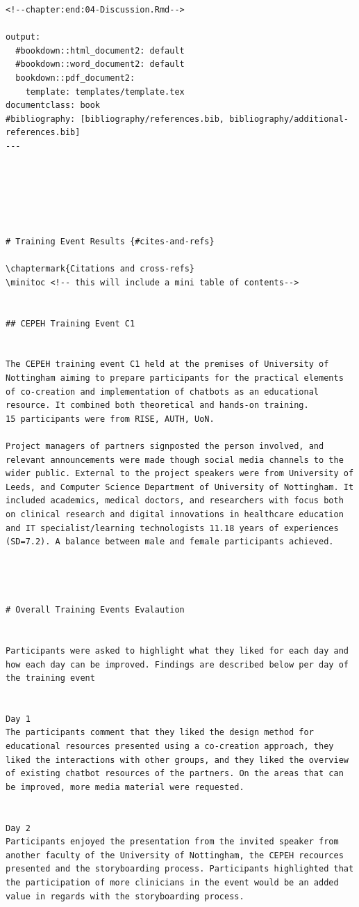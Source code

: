 \documentclass[a4paper, nobind]{templates/ociamthesis}
\renewcommand{\chaptermark}[1]{\markboth{\thechapter. #1}{\thechapter. #1}}
\begin{document}
\begin{verbatim}
<!--chapter:end:04-Discussion.Rmd-->

output:
  #bookdown::html_document2: default
  #bookdown::word_document2: default
  bookdown::pdf_document2: 
    template: templates/template.tex
documentclass: book
#bibliography: [bibliography/references.bib, bibliography/additional-references.bib]
---






# Training Event Results {#cites-and-refs}

\chaptermark{Citations and cross-refs}
\minitoc <!-- this will include a mini table of contents-->


## CEPEH Training Event C1


The CEPEH training event C1 held at the premises of University of Nottingham aiming to prepare participants for the practical elements of co-creation and implementation of chatbots as an educational resource. It combined both theoretical and hands-on training.
15 participants were from RISE, AUTH, UoN.

Project managers of partners signposted the person involved, and relevant announcements were made though social media channels to the wider public. External to the project speakers were from University of Leeds, and Computer Science Department of University of Nottingham. It included academics, medical doctors, and researchers with focus both on clinical research and digital innovations in healthcare education and IT specialist/learning technologists 11.18 years of experiences (SD=7.2). A balance between male and female participants achieved.



 
# Overall Training Events Evalaution


Participants were asked to highlight what they liked for each day and how each day can be improved. Findings are described below per day of the training event


Day 1  
The participants comment that they liked the design method for educational resources presented using a co-creation approach, they liked the interactions with other groups, and they liked the overview of existing chatbot resources of the partners. On the areas that can be improved, more media material were requested.


Day 2
Participants enjoyed the presentation from the invited speaker from another faculty of the University of Nottingham, the CEPEH recources presented and the storyboarding process. Participants highlighted that the participation of more clinicians in the event would be an added value in regards with the storyboarding process.



\end{verbatim}
\end{document}
